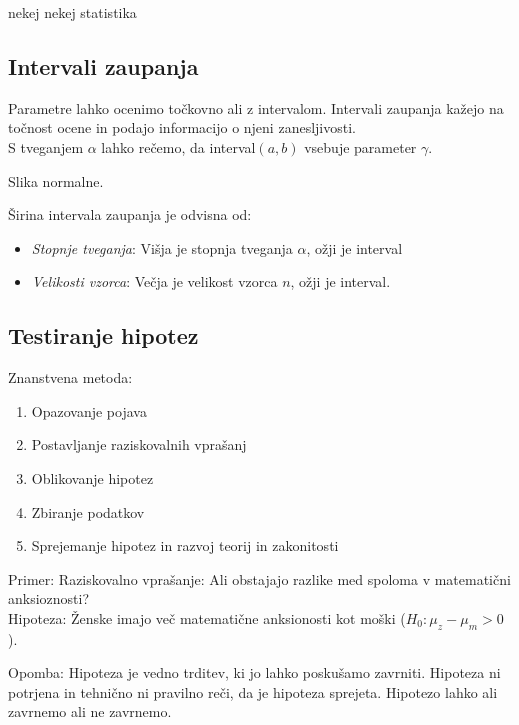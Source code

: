nekej nekej statistika

\subsection*{Intervali zaupanja}

Parametre lahko ocenimo točkovno ali z intervalom. Intervali zaupanja kažejo na točnost ocene in podajo informacijo o njeni zanesljivosti.\\
S tveganjem $\alpha$ lahko rečemo, da interval$(a,b)$ vsebuje parameter $\gamma$.

Slika normalne.

Širina intervala zaupanja je odvisna od:
\begin{itemize}
    \item \textit{Stopnje tveganja}: Višja je stopnja tveganja $\alpha$, ožji je interval
    \item \textit{Velikosti vzorca}: Večja je velikost vzorca $n$, ožji je interval.
\end{itemize}

\subsection*{Testiranje hipotez}

Znanstvena metoda:
\begin{enumerate}
    \item Opazovanje pojava
    \item Postavljanje raziskovalnih vprašanj
    \item Oblikovanje hipotez
    \item Zbiranje podatkov
    \item Sprejemanje hipotez in razvoj teorij in zakonitosti
\end{enumerate}

Primer: Raziskovalno vprašanje: Ali obstajajo razlike med spoloma v matematični anksioznosti?\\
Hipoteza: Ženske imajo več matematične anksionosti kot moški ($H_0: \mu_z - \mu_m >0$).

Opomba: Hipoteza je vedno trditev, ki jo lahko poskušamo zavrniti. Hipoteza ni potrjena in tehnično ni pravilno reči, da je hipoteza sprejeta. Hipotezo lahko ali zavrnemo ali ne zavrnemo.
